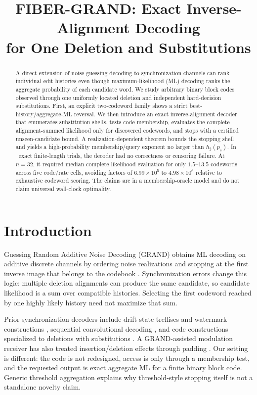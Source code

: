 \documentclass[conference]{IEEEtran}
\title{FIBER-GRAND: Exact Inverse-Alignment Decoding\\for One Deletion and Substitutions}
\author{\IEEEauthorblockN{Ali Fazeli}
\IEEEauthorblockA{Department of Electrical and Computer Engineering\\
University of Toronto, Toronto, Canada}}
\begin{document}
\maketitle

\begin{abstract}
A direct extension of noise-guessing decoding to synchronization channels can rank individual
edit histories even though maximum-likelihood (ML) decoding ranks the aggregate probability of
each candidate word. We study arbitrary binary block codes observed through one uniformly located
deletion and independent hard-decision substitutions. First, an explicit two-codeword family shows
a strict best-history/aggregate-ML reversal. We then introduce an exact inverse-alignment decoder
that enumerates substitution shells, tests code membership, evaluates the complete alignment-summed
likelihood only for discovered codewords, and stops with a certified unseen-candidate bound. A
realization-dependent theorem bounds the stopping shell and yields a high-probability membership/query
exponent no larger than $h_2(p_s)$. In \TotalTrials\ exact finite-length trials, the decoder had no
correctness or censoring failure. At $n=32$, it required median complete likelihood evaluation for
only $1.5$--$13.5$ codewords across five code/rate cells, avoiding factors of $6.99\times10^5$ to
$4.98\times10^6$ relative to exhaustive codeword scoring. The claims are in a membership-oracle
model and do not claim universal wall-clock optimality.
\end{abstract}

\section{Introduction}
Guessing Random Additive Noise Decoding (GRAND) obtains ML decoding on additive discrete channels
by ordering noise realizations and stopping at the first inverse image that belongs to the codebook
\cite{duffy2019grand}. Synchronization errors change this logic: multiple deletion alignments can
produce the same candidate, so candidate likelihood is a sum over compatible histories. Selecting
the first codeword reached by one highly likely history need not maximize that sum.

Prior synchronization decoders include drift-state trellises and watermark constructions
\cite{davey2001reliable}, sequential convolutional decoding \cite{banerjee2022sequential}, and
code constructions specialized to deletions with substitutions \cite{gabrys2023beyond}. A
GRAND-assisted modulation receiver has also treated insertion/deletion effects through padding
\cite{ozaydin2022optimal}. Our setting is different: the code is not redesigned, access is only
through a membership test, and the requested output is exact aggregate ML for a finite binary block
code. Generic threshold aggregation \cite{fagin2003optimal} explains why threshold-style stopping
itself is not a standalone novelty claim.
\end{document}
